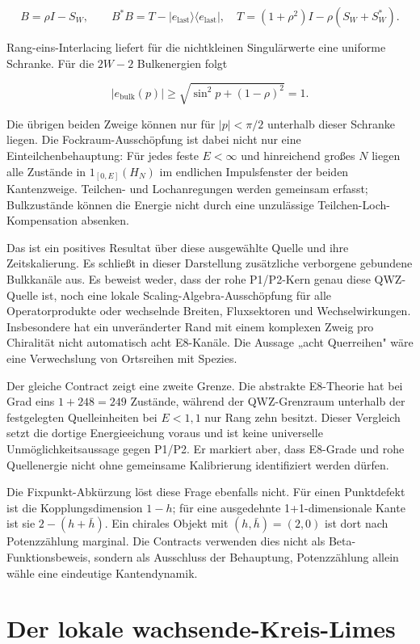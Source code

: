 \[
 B=\rho I-S_W,
\qquad B^*B=T-|e_\mathrm{last}\rangle\langle e_\mathrm{last}|,
\quad T=(1+\rho^2)I-\rho(S_W+S_W^*).
\]

Rang-eins-Interlacing liefert für die nichtkleinen Singulärwerte eine
uniforme Schranke. Für die $2W-2$ Bulkenergien folgt

\[
 |e_\mathrm{bulk}(p)|\ge
 \sqrt{\sin^2p+(1-\rho)^2}=1.
\]

Die übrigen beiden Zweige können nur für \(|p|<\pi/2\) unterhalb dieser
Schranke liegen. Die Fockraum-Ausschöpfung ist dabei nicht nur eine
Einteilchenbehauptung: Für jedes feste \(E<\infty\) und hinreichend großes \(N\) liegen alle Zustände in \(1_{[0,E]}(H_N)\) im endlichen Impulsfenster der beiden Kantenzweige. Teilchen- und Lochanregungen werden gemeinsam
erfasst; Bulkzustände können die Energie nicht durch eine unzulässige
Teilchen-Loch-Kompensation absenken.

Das ist ein positives Resultat über diese ausgewählte Quelle und ihre
Zeitskalierung. Es schließt in dieser Darstellung zusätzliche verborgene
gebundene Bulkkanäle aus. Es beweist weder, dass der rohe P1/P2-Kern genau
diese QWZ-Quelle ist, noch eine lokale Scaling-Algebra-Ausschöpfung für alle
Operatorprodukte oder wechselnde Breiten, Fluxsektoren und Wechselwirkungen.
Insbesondere hat ein unveränderter Rand mit einem komplexen Zweig pro
Chiralität nicht automatisch acht E8-Kanäle. Die Aussage „acht Querreihen"
wäre eine Verwechslung von Ortsreihen mit Spezies.

Der gleiche Contract zeigt eine zweite Grenze. Die abstrakte E8-Theorie hat
bei Grad eins $1+248=249$ Zustände, während der QWZ-Grenzraum unterhalb der
festgelegten Quelleinheiten bei \(E<1{,}1\) nur Rang zehn besitzt. Dieser
Vergleich setzt die dortige Energieeichung voraus und ist keine universelle
Unmöglichkeitsaussage gegen P1/P2. Er markiert aber, dass E8-Grade und rohe
Quellenergie nicht ohne gemeinsame Kalibrierung identifiziert werden dürfen.

Die Fixpunkt-Abkürzung löst diese Frage ebenfalls nicht. Für einen
Punktdefekt ist die Kopplungsdimension $1-h$; für eine ausgedehnte
1+1-dimensionale Kante ist sie $2-(h+\bar h)$. Ein chirales Objekt mit
$(h,\bar h)=(2,0)$ ist dort nach Potenzzählung marginal. Die Contracts
verwenden dies nicht als Beta-Funktionsbeweis, sondern als Ausschluss der
Behauptung, Potenzzählung allein wähle eine eindeutige Kantendynamik.

\section{Der lokale wachsende-Kreis-Limes}

